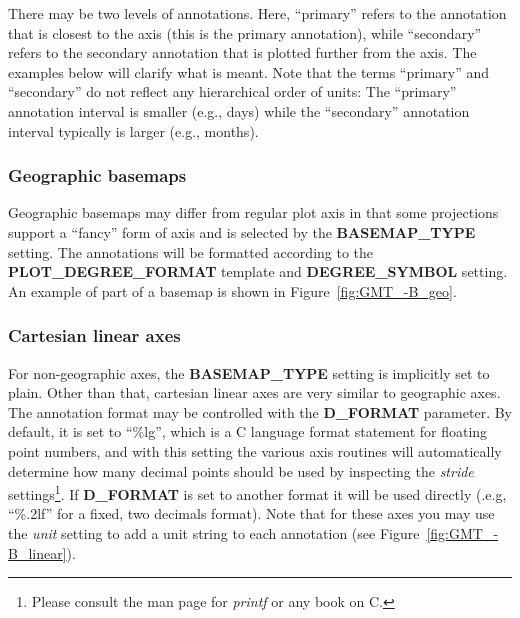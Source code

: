 There may be two levels of annotations.  Here, ``primary'' refers to the annotation
that is closest to the axis (this is the primary annotation), while ``secondary'' refers to the secondary
annotation that is plotted further from the axis.  The examples below
will clarify what is meant.  Note that the terms ``primary'' and ``secondary'' do not reflect any hierarchical
order of units: The ``primary'' annotation interval is smaller (e.g., days) while the
``secondary'' annotation interval typically is larger (e.g., months).

\subsubsection{Geographic basemaps}

Geographic basemaps may differ from regular plot axis in that some projections support a
``fancy'' form of axis and is selected by the {\bf BASEMAP\_TYPE} setting.  The annotations will be formatted according to
the {\bf PLOT\_DEGREE\_FORMAT} template and {\bf DEGREE\_SYMBOL} setting.  An example of part of a basemap is shown in Figure~\ref{fig:GMT_-B_geo}.


\subsubsection{Cartesian linear axes}

For non-geographic axes, the {\bf BASEMAP\_TYPE} setting is implicitly set to plain.  Other than that,
cartesian linear axes are very similar to geographic axes.  The annotation format may be controlled with
the {\bf D\_FORMAT} parameter.  By default, it is set to ``\%lg'', which is a C language format statement
for floating point numbers, and with this setting the various axis routines will automatically determine
how many decimal points should be used by inspecting the {\it stride} settings\footnote{Please consult
the man page for \emph{printf} or any book on C.}.  If {\bf D\_FORMAT} is set
to another format it will be used directly (.e.g, ``\%.2lf'' for a fixed, two decimals format).
Note that for these axes you may use the {\it unit} setting to
add a unit string to each annotation (see Figure~\ref{fig:GMT_-B_linear}).

